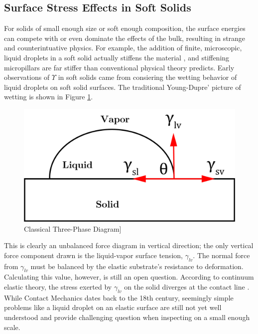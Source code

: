 \subsection{Surface Stress Effects in Soft Solids}
For solids of small enough size or soft enough composition, the surface energies can compete with or even dominate the effects of the bulk, resulting in strange and counterintuative physics. For example, the addition of finite, microscopic, liquid droplets in a soft solid actually stiffens the material \cite{style2015stiffening}, and stiffening micropillars are far stiffer than conventional physical theory predicts. 
Early observations of $ \Upsilon $ in soft solids came from consiering the wetting behavior of liquid droplets on soft solid surfaces.  The traditional Young-Dupre' picture of wetting is shown in Figure \ref{fig:three-phase}.


\begin{figure}[h!]
	\centering
	\includegraphics[width=.6\textwidth]{Chapters/Figures/phase_diagram.PNG}
	\caption[Three-Phase Diagram]{Classical Three-Phase Diagram]}
	\label{fig:three-phase} 
\end{figure}

This is clearly an unbalanced force diagram in vertical direction; the only vertical force component drawn is the liquid-vapor surface tension, $ \gamma_{lv} $. The normal force from $\gamma_{lv}$ must be balanced by the elastic substrate's resistance to deformation. Calculating this value, however, is still an open question. According to continuum elastic theory, the stress exerted by $\gamma_{lv}$ on the solid diverges at the contact line \cite{jerison2011deformation}. While Contact Mechanics dates back to the 18th century, seemingly simple problems like a liquid droplet on an elastic surface are still not yet well understood and provide challenging question when inspecting on a small enough scale.

